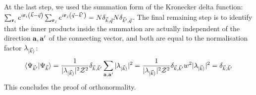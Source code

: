 \documentclass[reprint,hidelinks,onecolumn]{revtex4-2}
\begin{document}
At the last step, we used the summation form of the Kronecker delta function: \(\sum_{{\bf r}_i}e^{i {\bf r}_i \left( \vec k - \vec q \right) }\sum_{{\bf r}_j}e^{i {\bf r}_j \left( \vec q - \vec k^\prime \right) } = N \delta_{\vec k,\vec q}N \delta_{\vec k^\prime,\vec q}\). The final remaining step is to identify that the inner products inside the summation are actually independent of the direction \({\bf a}, {\bf a}^\prime\) of the connecting vector, and both are equal to the normalisation factor \(\lambda_{\ket{\vec k}}\):
\begin{equation}\begin{aligned}
	\braket{\Psi_{\vec k^\prime} | \Psi_{\vec k}} = \frac{1}{|\lambda_{\ket{\vec k}}|^2 \mathcal{Z}^2 } \delta_{\vec k, \vec k^\prime}\sum_{{\bf a},{\bf a}^\prime} |\lambda_{\ket{\vec k}}|^2 = \frac{1}{|\lambda_{\ket{\vec k}}|^2 \mathcal{Z}^2 } \delta_{\vec k, \vec k^\prime}w^2 |\lambda_{\ket{\vec k}}|^2 = \delta_{\vec k, \vec k^\prime}
\end{aligned}\end{equation}
This concludes the proof of orthonormality.
\end{document}
